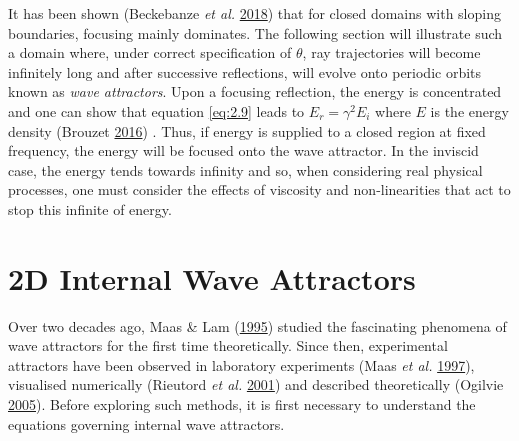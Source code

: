 \documentclass[a4paper]{article}
\numberwithin{equation}{section}
\begin{document}
It has been shown (Beckebanze \emph{et al.} \hyperlink{ref 8}{2018}) that for closed domains with sloping boundaries, focusing mainly dominates. The following section will illustrate such a domain where, under correct specification of $\theta$, ray trajectories will become infinitely long and after successive reflections, will evolve onto periodic orbits known as \emph{wave attractors}. Upon a focusing reflection, the energy is concentrated and one can show that equation \eqref{eq:2.9} leads to $E_r = \gamma^2 E_i$ where $E$ is the energy density (Brouzet \hyperlink{ref 9}{2016}) . Thus, if energy is supplied to a closed region at fixed frequency, the energy will be focused onto the wave attractor. In the inviscid case, the energy tends towards infinity and so, when considering real physical processes, one must consider the effects of viscosity and non-linearities that act to stop this infinite of energy. 

\section{2D Internal Wave Attractors}
\label{sec:3}
Over two decades ago, Maas \& Lam (\hyperlink{ref 10}{1995}) studied the fascinating phenomena of wave attractors for the first time theoretically. Since then, experimental attractors have been observed in laboratory experiments (Maas \emph{et al.} \hyperlink{ref 11}{1997}), visualised numerically (Rieutord \emph{et al.} \hyperlink{ref 12}{2001}) and described theoretically (Ogilvie \hyperlink{ref 13}{2005}). Before exploring such methods, it is first necessary to understand the equations governing internal wave attractors. 
\end{document}
